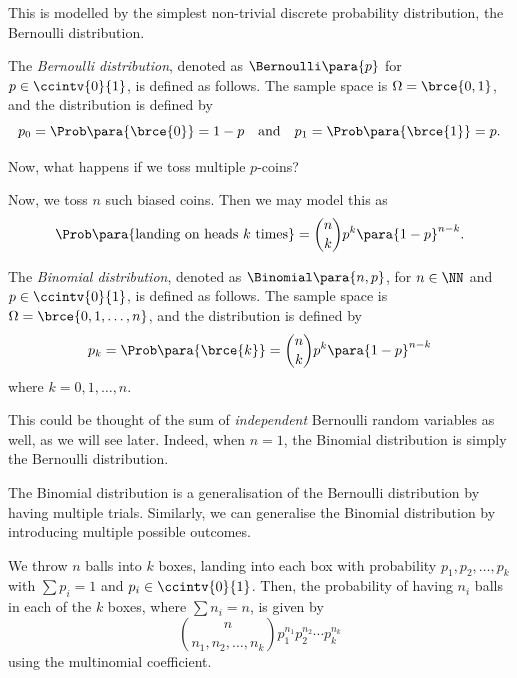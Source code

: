 This is modelled by the simplest non-trivial discrete probability distribution, the Bernoulli distribution.

\begin{definition}
    \label{def:bernoulli-distribution}%
    The \emph{Bernoulli distribution}, denoted as \(\Bernoulli\para{p}\) for \(p \in \ccintv{0}{1}\), is defined as follows. The sample space is \(\Omega = \brce{0, 1}\), and the distribution is defined by
    \[
        p_0 = \Prob\para{\brce{0}} = 1 - p \quad \text{and} \quad p_1 = \Prob\para{\brce{1}} = p.
    \]
\end{definition}

Now, what happens if we toss multiple \(p\)-coins? 

\begin{example}
    \label{ex:tossing-multiple-biased-coins}%
    Now, we toss \(n\) such biased coins. Then we may model this as
    \[
        \Prob\para{\text{landing on heads }k\text{ times}} = \binom{n}{k} p^k \para{1 - p}^{n - k}.
    \]
\end{example}

\begin{definition}
    \label{def:binomial-distribution}%
    The \emph{Binomial distribution}, denoted as \(\Binomial\para{n, p}\), for \(n \in \NN\) and \(p \in \ccintv{0}{1}\), is defined as follows. The sample space is \(\Omega = \brce{0, 1, \ldots, n}\), and the distribution is defined by
    \[
        p_k = \Prob\para{\brce{k}}= \binom{n}{k} p^k \para{1 - p}^{n - k}
    \]
    where \(k = 0, 1, \ldots, n\).
\end{definition}

This could be thought of the sum of \emph{independent} Bernoulli random variables as well, as we will see later. Indeed, when \(n = 1\), the Binomial distribution is simply the Bernoulli distribution.

The Binomial distribution is a generalisation of the Bernoulli distribution by having multiple trials. Similarly, we can generalise the Binomial distribution by introducing multiple possible outcomes.

\begin{example}
    \label{ex:throwing-balls-into-boxes}%
    We throw \(n\) balls into \(k\) boxes, landing into each box with probability \(p_1, p_2, \ldots, p_k\) with \(\sum p_i = 1\) and \(p_i \in \ccintv{0}{1}\). Then, the probability of having \(n_i\) balls in each of the \(k\) boxes, where \(\sum n_i = n\), is given by
    \[
        \binom{n}{n_1, n_2, \ldots, n_k} p_1^{n_1} p_2^{n_2} \cdots p_k^{n_k}
    \]
    using the multinomial coefficient.
\end{example}

